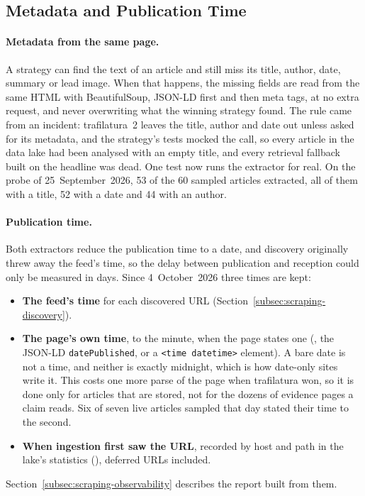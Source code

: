 
\subsection{Metadata and Publication Time}
\label{subsec:scraping-metadata}

\paragraph{Metadata from the same page.} A strategy can find the text
of an article and still miss its title, author, date, summary or lead
image. When that happens, the missing fields are read from the same
HTML with BeautifulSoup, JSON-LD first and then meta tags, at no extra
request, and never overwriting what the winning strategy found. The
rule came from an incident: trafilatura~2 leaves the title, author and
date out unless asked for its metadata, and the strategy's tests
mocked the call, so every article in the data lake had been analysed
with an empty title, and every retrieval fallback built on the headline
was dead. One test now runs the extractor for real. On the probe of 25~September~2026, 53 of the 60
sampled articles extracted, all of them with a title, 52 with a date
and 44 with an author.

\paragraph{Publication time.} Both extractors reduce the publication
time to a date, and discovery originally threw away the feed's time, so
the delay between publication and reception could only be measured in
days. Since 4~October~2026 three times are kept:

\begin{itemize}
    \item \textbf{The feed's time} for each discovered URL
    (Section~\ref{subsec:scraping-discovery}).
    \item \textbf{The page's own time}, to the minute, when the page
    states one (, the JSON-LD
    \texttt{datePublished}, or a \texttt{<time datetime>} element). A
    bare date is not a time, and neither is exactly midnight, which is
    how date-only sites write it. This costs one more parse of the page
    when trafilatura won, so it is done only for articles that are
    stored, not for the dozens of evidence pages a claim reads. Six of
    seven live articles sampled that day stated their time to the
    second.
    \item \textbf{When ingestion first saw the URL}, recorded by host
    and path in the lake's statistics (),
    deferred URLs included.
\end{itemize}

Section~\ref{subsec:scraping-observability} describes the report built
from them.
